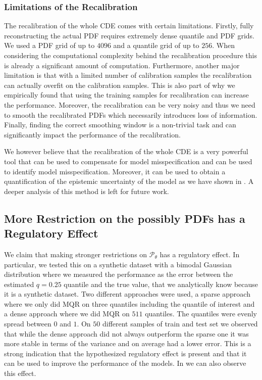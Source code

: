 \subsubsection{Limitations of the Recalibration}\label{sec:limitations_recalibration_practical}

The recalibration of the whole CDE comes with certain limitations. Firstly, fully reconstructing the actual PDF requires extremely dense quantile and PDF grids. We used a PDF grid of up to $4096$ and a quantile grid of up to $256$. When considering the computational complexity behind the recalibration procedure this is already a significant amount of computation. Furthermore, another major limitation is that with a limited number of calibration samples the recalibration can actually overfit on the calibration samples. This is also part of why we empirically found that using the training samples for recalibration can increase the performance. Moreover, the recalibration can be very noisy and thus we need to smooth the recalibrated PDFs which necessarily introduces loss of information. Finally, finding the correct smoothing window is a non-trivial task and can significantly impact the performance of the recalibration.

We however believe that the recalibration of the whole CDE is a very powerful tool that can be used to compensate for model misspecification and can be used to identify model misspecification. Moreover, it can be used to obtain a quantification of the epistemic uncertainty of the model as we have shown in . A deeper analysis of this method is left for future work.

\subsection{More Restriction on the possibly PDFs has a Regulatory Effect}\label{sec:experiment_results_more_restriction}

We claim that making stronger restrictions on $\mathscr{P}_\theta$ has a regulatory effect. In particular, we tested this on a synthetic dataset with a bimodal Gaussian distribution where we measured the performance as the error between the estimated $q = 0.25$ quantile and the true value, that we analytically know because it is a synthetic dataset. Two different approaches were used, a sparse approach where we only did MQR on three quantiles including the quantile of interest and a dense approach where we did MQR on $511$ quantiles. The quantiles were evenly spread between $0$ and $1$. On $50$ different samples of train and test set we observed that while the dense approach did not always outperform the sparse one it was more stable in terms of the variance and on average had a lower error. This is a strong indication that the hypothesized regulatory effect is present and that it can be used to improve the performance of the models. In  we can also observe this effect.

